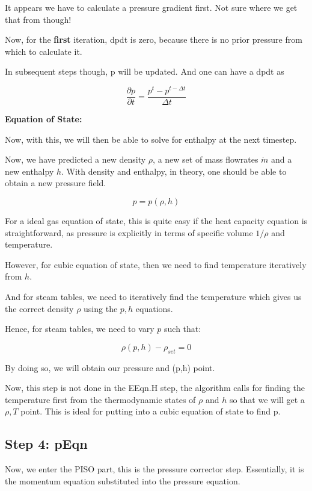 \documentclass[masters]{ucbthesis}
\renewcommand{\_}{\kern-1.5pt\textunderscore\kern-1.5pt}
\begin{document}
It appears we have to calculate a pressure gradient first.
Not sure where we get that from though!

Now, for the \textbf{first} iteration, dpdt is zero, because there is 
no prior pressure from which to calculate it.

In subsequent steps though, p will be updated. And one can have a dpdt as 

\begin{equation*}
	\frac{\partial p}{\partial t} = \frac{p^{t} - p^{t - \Delta t}}{\Delta t}
\end{equation*}

\textbf{Equation of State:}


Now, with this, we will then be able to solve for enthalpy at the next 
timestep.

Now, we have predicted a new density $\rho$, a new set of mass flowrates 
$\dot{m}$ and a new enthalpy $h$. With density and enthalpy, in theory, 
one should be able to obtain a new pressure field.

$$p = p(\rho,h)$$

For a ideal gas equation of state, this is quite easy if the heat capacity 
equation is straightforward, as pressure is explicitly 
in terms of specific volume $1/\rho$ and temperature. 

However, for cubic equation of state, then we need to find temperature 
iteratively from $h$. 

And for steam tables, we need to iteratively find the temperature which 
gives us the correct density $\rho$ using the $p,h$ equations.

Hence, for steam tables, we need to vary $p$ such that:

$$ \rho(p,h) - \rho_{set} = 0 $$

By doing so, we will obtain our pressure and (p,h) point.

Now, this step is not done in the EEqn.H step, the algorithm calls 
for finding the temperature first from the thermodynamic states of 
$\rho$ and $h$ so that we will get a $\rho,T$ point. This is ideal for 
putting into a cubic equation of state to find p.


\subsection{Step 4: pEqn}

Now, we enter the PISO part, this is the pressure corrector step.
Essentially, it is the momentum equation substituted into the pressure 
equation.
\end{document}
